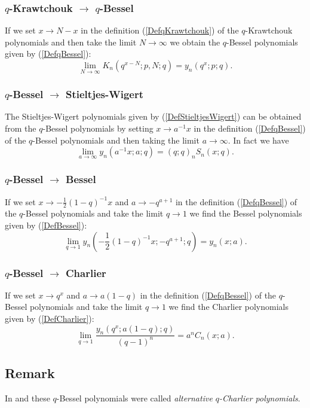 \documentclass[envcountchap,graybox]{svmono}
\newcounter{rom}
\begin{document}
\subsubsection*{$q$-Krawtchouk $\rightarrow$ $q$-Bessel}
If we set $x\rightarrow N-x$ in the definition (\ref{DefqKrawtchouk}) of the
$q$-Krawtchouk polynomials and then take the limit $N\rightarrow\infty$ we
obtain the $q$-Bessel polynomials given by (\ref{DefqBessel}):
$$\lim_{N\rightarrow\infty}K_n(q^{x-N};p,N;q)=y_n(q^x;p;q).$$

\subsubsection*{$q$-Bessel $\rightarrow$ Stieltjes-Wigert}
The Stieltjes-Wigert polynomials given by (\ref{DefStieltjesWigert}) can be obtained
from the $q$-Bessel polynomials by setting $x\rightarrow a^{-1}x$ in the definition
(\ref{DefqBessel}) of the $q$-Bessel polynomials and then taking the limit
$a\rightarrow\infty$. In fact we have
\begin{equation}
\lim_{a\rightarrow\infty}y_n(a^{-1}x;a;q)=(q;q)_nS_n(x;q).
\end{equation}

\subsubsection*{$q$-Bessel $\rightarrow$ Bessel}
If we set $x\rightarrow -\frac{1}{2}(1-q)^{-1}x$ and $a\rightarrow -q^{a+1}$ in the definition
(\ref{DefqBessel}) of the $q$-Bessel polynomials and take the limit $q\rightarrow 1$
we find the Bessel polynomials given by (\ref{DefBessel}):
\begin{equation}
\lim_{q\rightarrow 1}y_n(-\textstyle\frac{1}{2}(1-q)^{-1}x;-q^{a+1};q)=y_n(x;a).
\end{equation}

\subsubsection*{$q$-Bessel $\rightarrow$ Charlier}
If we set $x\rightarrow q^x$ and $a\rightarrow a(1-q)$ in the definition (\ref{DefqBessel})
of the $q$-Bessel polynomials and take the limit $q\rightarrow 1$ we find the Charlier
polynomials given by (\ref{DefCharlier}):
\begin{equation}
\lim_{q\rightarrow 1}\frac{y_n(q^x;a(1-q);q)}{(q-1)^n}=a^nC_n(x;a).
\end{equation}

\subsection*{Remark}
In \cite{Koekoek94} and \cite{Koekoek98} these $q$-Bessel polynomials were called
\emph{alternative $q$-Charlier polynomials}.
\end{document}
